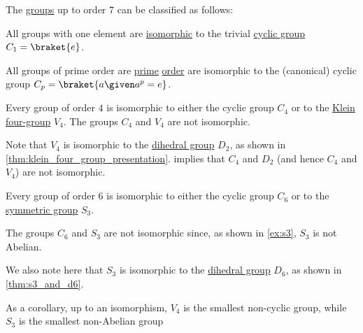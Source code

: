 \begin{proposition}\label{thm:clasification_of_small_groups}
  The \hyperref[def:group]{groups} up to order \( 7 \) can be classified as follows:
  \begin{thmenum}
     All groups with one element are \hyperref[def:group/morphism]{isomorphic} to the trivial \hyperref[def:cyclic_group]{cyclic group} \( C_1 = \braket{ e } \).

     All groups of prime order are \hyperref[def:prime_number]{prime} \hyperref[def:group_order]{order} are isomorphic to the (canonical) cyclic group \( C_p = \braket{ a \given a^p = e } \).

     Every group of order \( 4 \) is isomorphic to either the cyclic group \( C_4 \) or to the \hyperref[def:klein_four_group]{Klein four-group} \( V_4 \). The groups \( C_4 \) and \( V_4 \) are not isomorphic.

    Note that \( V_4 \) is isomorphic to the \hyperref[def:dihedral_group]{dihedral group} \( D_2 \), as shown in \cref{thm:klein_four_group_presentation}.  implies that \( C_4 \) and \( D_2 \) (and hence \( C_4 \) and \( V_4 \)) are not isomorphic.

     Every group of order \( 6 \) is isomorphic to either the cyclic group \( C_6 \) or to the \hyperref[def:symmetric_group]{symmetric group} \( S_3 \).

    The groups \( C_6 \) and \( S_3 \) are not isomorphic since, as shown in \cref{ex:s3}, \( S_3 \) is not Abelian.

    We also note here that \( S_3 \) is isomorphic to the \hyperref[def:dihedral_group]{dihedral group} \( D_6 \), as shown in \cref{thm:s3_and_d6}.
  \end{thmenum}
\end{proposition}
\begin{comments}
  \item As a corollary, up to an isomorphism, \( V_4 \) is the smallest non-cyclic group, while \( S_3 \) is the smallest non-Abelian group
\end{comments}
